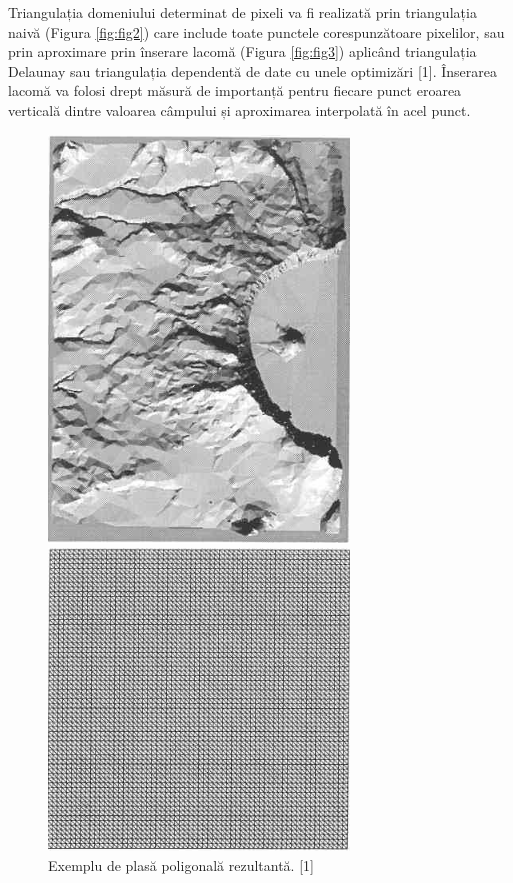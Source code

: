 \documentclass[12pt]{article}
\begin{document}
Triangulația domeniului determinat de pixeli va fi realizată prin triangulația naivă (Figura \ref{fig:fig2}) care include toate punctele corespunzătoare pixelilor, sau prin aproximare prin înserare lacomă (Figura \ref{fig:fig3}) aplicând triangulația Delaunay sau triangulația dependentă de date cu unele optimizări [1]. Înserarea lacomă va folosi drept măsură de importanță pentru fiecare punct eroarea verticală dintre valoarea câmpului și aproximarea interpolată în acel punct.

\begin{figure}[!htb]
	\begin{minipage}{0.32\textwidth}
		\centering
		\includegraphics[width=.7\linewidth]{ExempluPlasa.png}
		\caption{Exemplu de plasă poligonală rezultantă. [1]}\label{fig:fig1}
	\end{minipage}\hfill
	\begin{minipage}{0.32\textwidth}
		\centering
		\includegraphics[width=.7\linewidth]{ExempluTriangulatieNaiva.png}

\end{minipage}
\end{figure}
\end{document}
